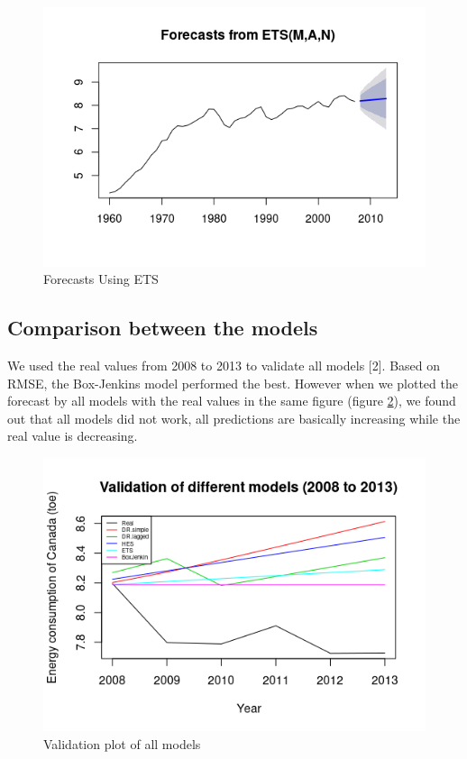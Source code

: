 \documentclass[journal, a4paper]{IEEEtran}
\begin{document}
 


 \begin{figure}[H]
\begin{center}
\includegraphics[scale=0.4]{fig2/can_ets_forecast.png}
\caption{Forecasts Using ETS}
\label{fig2:can_ets_forecast}
\end{center}
\end{figure} 
 
\subsection{Comparison between the models}
We used the real values from 2008 to 2013 to validate all models [2]. Based on RMSE, the Box-Jenkins model performed the best. However when we plotted the forecast by all models with the real values in the same figure (figure \ref{fig2:validation_plot}), we found out that all models did not work, all predictions are basically increasing while the real value is decreasing.

\begin{figure}[H]
\begin{center}
\includegraphics[scale=0.4]{fig2/validation_plot.png}
\caption{Validation plot of all models}
\label{fig2:validation_plot}
\end{center}
\end{figure}
\end{document}
